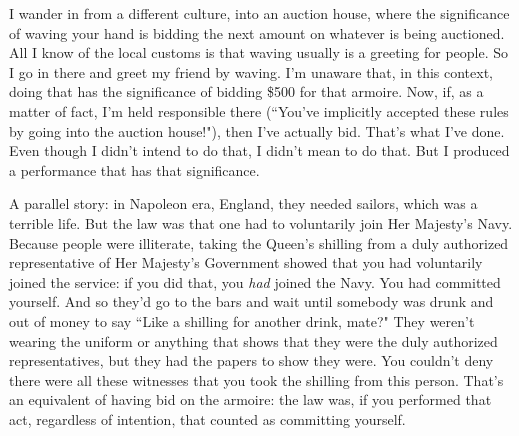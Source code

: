 I wander in from a different culture, into an auction house, where the significance of waving your hand is bidding the next amount on whatever is being auctioned. All I know of the local customs is that waving usually is a greeting for people. So I go in there and greet my friend by waving. I'm unaware that, in this context, doing that has the significance of bidding \$500 for that armoire. Now, if, as a matter of fact, I'm held responsible there (``You've implicitly accepted these rules by going into the auction house!"), then I've actually bid. That's what I've done. Even though I didn't intend to do that, I didn't mean to do that. But I produced a performance that has that significance.

A parallel story: in Napoleon era, England, they needed sailors, which was a terrible life. But the law was that one had to voluntarily join Her Majesty's Navy. Because people were illiterate, taking the Queen's shilling from a duly authorized representative of Her Majesty's Government showed that you had voluntarily joined the service: if you did that, you \emph{had} joined the Navy. You had committed yourself. And so they'd go to the bars and wait until somebody was drunk and out of money to say ``Like a shilling for another drink, mate?" They weren't wearing the uniform or anything that shows that they were the duly authorized representatives, but they had the papers to show they were. You couldn't deny there were all these witnesses that you took the shilling from this person. That's an equivalent of having bid on the armoire: the law was, if you performed that act, regardless of intention, that counted as committing yourself.